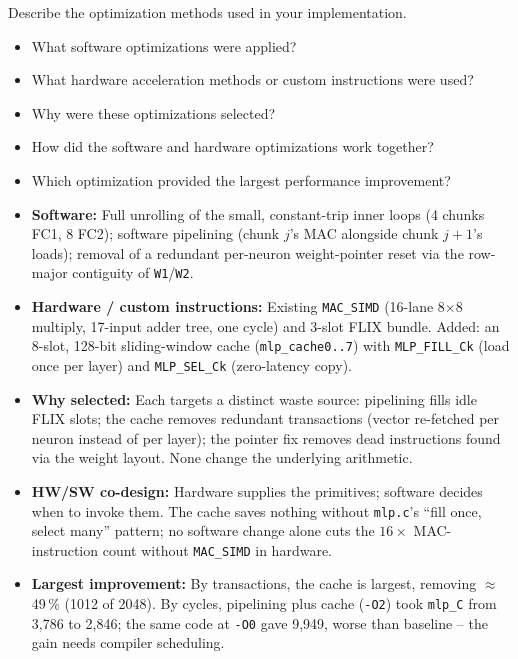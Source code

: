 \documentclass[11pt,a4paper]{report}
\newcommand{\answer}[1]{\vspace{-1.5em}\begin{oframed}#1\end{oframed}}
\begin{document}
Describe the optimization methods used in your implementation.
\begin{itemize}
    \item What software optimizations were applied?
    \item What hardware acceleration methods or custom instructions were used?
    \item Why were these optimizations selected?
    \item How did the software and hardware optimizations work together?
    \item Which optimization provided the largest performance improvement?
\end{itemize}
\answer{
\begin{itemize}
    \item \textbf{Software:} Full unrolling of the small,
        constant-trip inner loops (4 chunks FC1, 8 FC2); software
        pipelining (chunk $j$'s MAC alongside chunk $j{+}1$'s loads);
        removal of a redundant per-neuron weight-pointer reset via the
        row-major contiguity of \texttt{W1}/\texttt{W2}.
    \item \textbf{Hardware / custom instructions:} Existing
        \texttt{MAC\_SIMD} (16-lane 8$\times$8 multiply, 17-input adder
        tree, one cycle) and 3-slot FLIX bundle. Added: an 8-slot,
        128-bit sliding-window cache (\texttt{mlp\_cache0..7}) with
        \texttt{MLP\_FILL\_Ck} (load once per layer) and
        \texttt{MLP\_SEL\_Ck} (zero-latency copy).
    \item \textbf{Why selected:} Each targets a distinct waste source:
        pipelining fills idle FLIX slots; the cache removes redundant
        transactions (vector re-fetched per neuron instead of per
        layer); the pointer fix removes dead instructions found via
        the weight layout. None change the underlying arithmetic.
    \item \textbf{HW/SW co-design:} Hardware supplies the primitives;
        software decides when to invoke them. The cache saves nothing
        without \texttt{mlp.c}'s ``fill once, select many'' pattern;
        no software change alone cuts the $16\times$ MAC-instruction
        count without \texttt{MAC\_SIMD} in hardware.
    \item \textbf{Largest improvement:} By transactions, the cache is
        largest, removing $\approx$49\,\% (1012 of 2048). By cycles,
        pipelining plus cache (\texttt{-O2}) took \texttt{mlp\_C} from
        3{,}786 to 2{,}846; the same code at \texttt{-O0} gave 9{,}949,
        worse than baseline -- the gain needs compiler scheduling.
\end{itemize}
}
\end{document}
